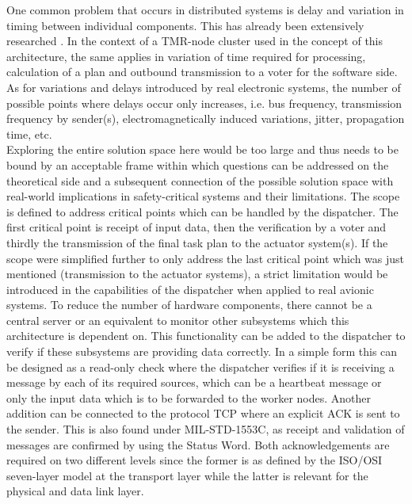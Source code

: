 One common problem that occurs in distributed systems is delay and variation in timing between individual components. This has already been extensively researched \parencite{lamport_time_1978, steen_distributed_2025}. In the context of a TMR-node cluster used in the concept of this architecture, the same applies in variation of time required for processing, calculation of a plan and outbound transmission to a voter for the software side. As for variations and delays introduced by real electronic systems, the number of possible points where delays occur only increases, i.e. bus frequency, transmission frequency by sender(s), electromagnetically induced variations, jitter, propagation time, etc.\\
Exploring the entire solution space here would be too large and thus needs to be bound by an acceptable frame within which questions can be addressed on the theoretical side and a subsequent connection of the possible solution space with real-world implications in safety-critical systems and their limitations. The scope is defined to address critical points which can be handled by the dispatcher. The first critical point is receipt of input data, then the verification by a voter and thirdly the transmission of the final task plan to the actuator system(s). If the scope were simplified further to only address the last critical point which was just mentioned (transmission to the actuator systems), a strict limitation would be introduced in the capabilities of the dispatcher when applied to real avionic systems. To reduce the number of hardware components, there cannot be a central server or an equivalent to monitor other subsystems which this architecture is dependent on. This functionality can be added to the dispatcher to verify if these subsystems are providing data correctly. In a simple form this can be designed as a read-only check where the dispatcher verifies if it is receiving a message by each of its required sources, which can be a heartbeat message or only the input data which is to be forwarded to the worker nodes. Another addition can be connected to the protocol TCP where an explicit ACK is sent to the sender. This is also found under MIL-STD-1553C, as receipt and validation of messages are confirmed by using the Status Word. Both acknowledgements are required on two different levels since the former is as defined by the ISO/OSI seven-layer model at the transport layer while the latter is relevant for the physical and data link layer.

